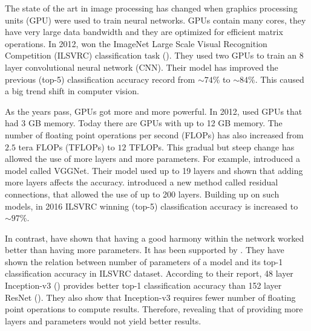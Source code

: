 
The state of the art in image processing has changed when graphics processing units (GPU) were used to train neural networks. GPUs contain many cores, they have very large data bandwidth and they are optimized for efficient matrix operations. In 2012, \cite{krizhevsky2012imagenet} won the ImageNet Large Scale Visual Recognition Competition (ILSVRC) classification task (\cite{deng2012image}). They used two GPUs to train an 8 layer convolutional neural network (CNN). Their model has improved the previous (top-5) classification accuracy record from $\sim 74\%$ to $\sim 84\%$. This caused a big trend shift in computer vision. 

As the years pass, GPUs got more and more powerful. In 2012, \cite{krizhevsky2012imagenet} used GPUs that had 3 GB memory. Today there are GPUs with up to 12 GB memory. The number of floating point operations per second (FLOPs) has also increased from $2.5$ tera FLOPs (TFLOPs) to $12$ TFLOPs. This gradual but steep change has allowed the use of more layers and more parameters. For example, \cite{Simonyan:2014aa} introduced a model called VGGNet. Their model used up to 19 layers and shown that adding more layers affects the accuracy. \cite{He:2015aa} introduced a new method called residual connections, that allowed the use of up to 200 layers. Building up on such models, in 2016 ILSVRC winning (top-5) classification accuracy is increased to $\sim 97\%$. 

In contrast, \cite{Szegedy:2014aa} have shown that having a good harmony within the network worked better than having more parameters. It has been supported by \cite{Canziani:2016aa}. They have shown the relation between number of parameters of a model and its top-1 classification accuracy in ILSVRC dataset. According to their report, 48 layer Inception-v3 (\cite{Szegedy_2016_CVPR}) provides better top-1 classification accuracy than 152 layer ResNet (\cite{He:2015aa}). They also show that Inception-v3 requires fewer number of floating point operations to compute results. Therefore, revealing that of providing more layers and parameters would not yield better results. 


